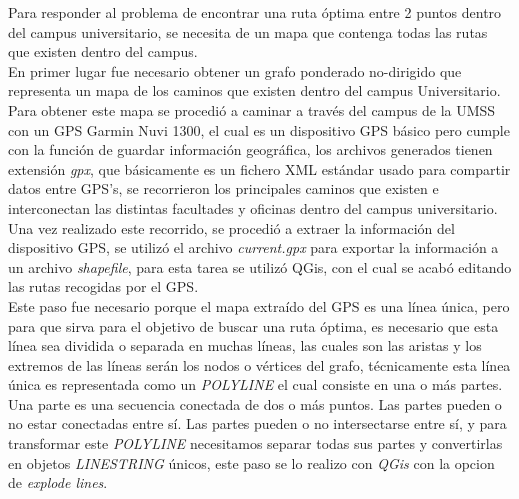 Para responder al problema de encontrar una ruta óptima entre 2 puntos dentro del campus universitario, se necesita de un mapa que contenga todas las rutas que existen dentro del campus.\\


 En primer lugar fue necesario obtener un grafo ponderado no-dirigido que representa un mapa de los caminos que existen dentro del campus Universitario.\\

 Para obtener este mapa se procedió a caminar a través del campus de la UMSS con un GPS Garmin Nuvi 1300, el cual es un dispositivo GPS básico pero cumple con la función de guardar información geográfica, los archivos generados tienen extensión \emph{gpx}, que básicamente es un fichero XML estándar usado para compartir datos entre GPS's, se recorrieron los principales caminos que existen e interconectan las distintas facultades y oficinas dentro del campus universitario. Una vez realizado este recorrido, se procedió a extraer la información del dispositivo GPS, se utilizó el archivo \emph{current.gpx} para exportar la información  a un archivo \emph{shapefile}, para esta tarea se utilizó QGis, con el cual se acabó editando las rutas recogidas por el GPS.\\


 Este paso fue necesario porque el mapa extraído del GPS es una línea única, pero para que sirva para el objetivo de buscar una ruta óptima, es necesario que esta línea sea dividida o separada en muchas líneas, las cuales son las aristas y los extremos de las líneas serán los nodos o vértices del grafo,
 técnicamente esta línea única es representada como un \emph{POLYLINE} el cual consiste en una o más partes. Una parte es una secuencia conectada de dos o más puntos. Las partes pueden o no estar conectadas entre sí. Las partes pueden o no intersectarse entre sí, y para transformar este \emph{POLYLINE} necesitamos separar todas sus partes y convertirlas en objetos \emph{LINESTRING} únicos, este paso se lo realizo con \emph{QGis} con la opcion de \emph{explode lines}. \cite{esri_shapefile} \\

